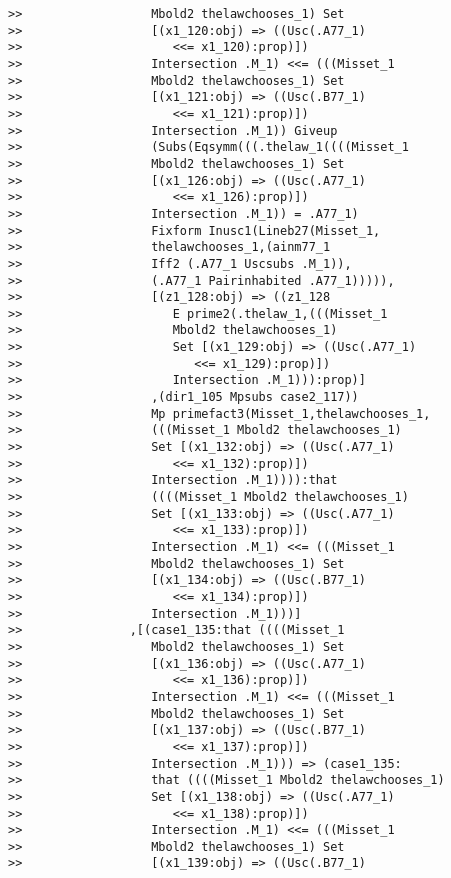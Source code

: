 \documentclass[12pt]{article}
\begin{document}
\begin{verbatim}
>>                  Mbold2 thelawchooses_1) Set
>>                  [(x1_120:obj) => ((Usc(.A77_1)
>>                     <<= x1_120):prop)])
>>                  Intersection .M_1) <<= (((Misset_1
>>                  Mbold2 thelawchooses_1) Set
>>                  [(x1_121:obj) => ((Usc(.B77_1)
>>                     <<= x1_121):prop)])
>>                  Intersection .M_1)) Giveup
>>                  (Subs(Eqsymm(((.thelaw_1((((Misset_1
>>                  Mbold2 thelawchooses_1) Set
>>                  [(x1_126:obj) => ((Usc(.A77_1)
>>                     <<= x1_126):prop)])
>>                  Intersection .M_1)) = .A77_1)
>>                  Fixform Inusc1(Lineb27(Misset_1,
>>                  thelawchooses_1,(ainm77_1
>>                  Iff2 (.A77_1 Uscsubs .M_1)),
>>                  (.A77_1 Pairinhabited .A77_1))))),
>>                  [(z1_128:obj) => ((z1_128
>>                     E prime2(.thelaw_1,(((Misset_1
>>                     Mbold2 thelawchooses_1)
>>                     Set [(x1_129:obj) => ((Usc(.A77_1)
>>                        <<= x1_129):prop)])
>>                     Intersection .M_1))):prop)]
>>                  ,(dir1_105 Mpsubs case2_117))
>>                  Mp primefact3(Misset_1,thelawchooses_1,
>>                  (((Misset_1 Mbold2 thelawchooses_1)
>>                  Set [(x1_132:obj) => ((Usc(.A77_1)
>>                     <<= x1_132):prop)])
>>                  Intersection .M_1)))):that
>>                  ((((Misset_1 Mbold2 thelawchooses_1)
>>                  Set [(x1_133:obj) => ((Usc(.A77_1)
>>                     <<= x1_133):prop)])
>>                  Intersection .M_1) <<= (((Misset_1
>>                  Mbold2 thelawchooses_1) Set
>>                  [(x1_134:obj) => ((Usc(.B77_1)
>>                     <<= x1_134):prop)])
>>                  Intersection .M_1)))]
>>               ,[(case1_135:that ((((Misset_1
>>                  Mbold2 thelawchooses_1) Set
>>                  [(x1_136:obj) => ((Usc(.A77_1)
>>                     <<= x1_136):prop)])
>>                  Intersection .M_1) <<= (((Misset_1
>>                  Mbold2 thelawchooses_1) Set
>>                  [(x1_137:obj) => ((Usc(.B77_1)
>>                     <<= x1_137):prop)])
>>                  Intersection .M_1))) => (case1_135:
>>                  that ((((Misset_1 Mbold2 thelawchooses_1)
>>                  Set [(x1_138:obj) => ((Usc(.A77_1)
>>                     <<= x1_138):prop)])
>>                  Intersection .M_1) <<= (((Misset_1
>>                  Mbold2 thelawchooses_1) Set
>>                  [(x1_139:obj) => ((Usc(.B77_1)

\end{verbatim}
\end{document}
